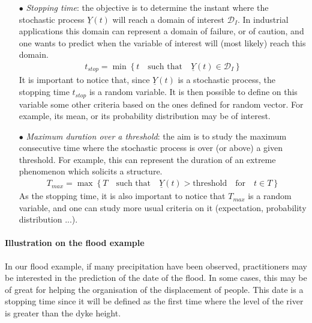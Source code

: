\begin{itemize}
\item[$\bullet$] {\em Stopping time}: the objective is to determine the instant where the stochastic process $\underline{Y}(t)$ will reach a domain of interest $\mathcal{D}_I$.
  In industrial applications this domain can represent a domain of failure, or of caution, and one wants to predict when the variable of interest will (most likely) reach this domain.
  \begin{align*}
    t_{stop} = \min \left\{ t \quad\mbox{such that}\quad \underline{Y}(t) \in \mathcal{D}_I \right\}
  \end{align*}
  It is important to notice that, since $\underline{Y}(t)$ is a stochastic process, the stopping time $t_{stop}$ is a random variable. It is then possible to define on this variable some other
  criteria based on the ones defined for random vector. For example, its mean, or its probability distribution may be of interest.


\item[$\bullet$] {\em Maximum duration over a threshold}: the aim is to study the maximum consecutive time where the stochastic process is over (or above) a given threshold.
  For example, this can represent the duration of an extreme phenomenon which solicits a structure.
  \begin{align*}
    T_{max} = \max \left\{ T \quad\mbox{such that}\quad \underline{Y}(t) > \textrm{threshold} \quad \mbox{for} \quad t \in T \right\}
  \end{align*}
  As the stopping time, it is also important to notice that $T_{max}$ is a random variable, and one can study more usual criteria on it (expectation, probability distribution ...).

\end{itemize}

\paragraph{Illustration on the flood example}
\par

In our flood example, if many precipitation have been observed, practitioners may be interested in the prediction of the date of the flood.
In some cases, this may be of great for helping the organisation of the displacement of people.
This date is a stopping time since it will be defined as the first time where the level of the river is greater than the dyke height.

